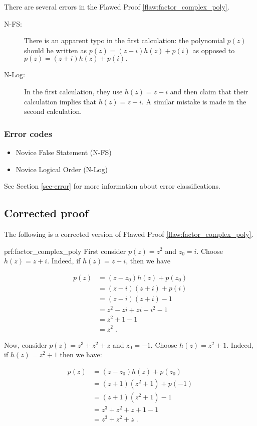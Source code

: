 
There are several errors
 in the Flawed Proof \ref{flaw:factor_complex_poly}. %


 \begin{description}
 	\item[N-FS:] There is an apparent typo in the first calculation: the polynomial $p(z)$ should be written as $p(z) = (z - i)h(z) + p(i)$ as opposed to $p(z) = (z + i)h(z) + p(i).$
 	\item[N-Log:] In the first calculation, they use $h(z) = z-i$ and then claim that their calculation implies that $h(z) = z-i$. A similar mistake is made in the second calculation.
 \end{description}


\subsubsection{Error codes}
\begin{itemize}
	\item 	Novice False Statement (N-FS)
	\item   Novice Logical Order (N-Log)
\end{itemize}
See Section \ref{sec-error} for more information about error classifications.

\clearpage
\subsection{Corrected proof}

The following is a corrected version of Flawed Proof \ref{flaw:factor_complex_poly}. %

\begin{prf}{prf:factor_complex_poly} %
First consider $p(z) = z^2$  and $z_0 = i$.  Choose $h(z) = z+i$. Indeed, if $h(z) = z+i$, then we have

\begin{align*}
    p(z) &= (z - z_0)h(z) + p(z_0) \\
    &= (z - i)(z+i) + p(i) \\
    &= (z - i)(z +i) - 1 \\
    &= z^2 - zi + zi - i^2 - 1 \\
    &= z^2 + 1 -1 \\
    &= z^2\;.
\end{align*}

Now, consider $p(z) = z^3 + z^2 + z$  and $z_0 = -1$.  Choose $h(z) = z^2+1$. Indeed, if $h(z) = z^2+1$ then we have:

\begin{align*}
    p(z) &= (z - z_0)h(z) + p(z_0) \\
    &= (z + 1)(z^2+1) + p(-1) \\
    &= (z + 1)(z^2 +1) - 1 \\
    &= z^3 + z^2 +z +1 -1\\
    &= z^3 + z^2 +z\;.
\end{align*}
\end{prf}
